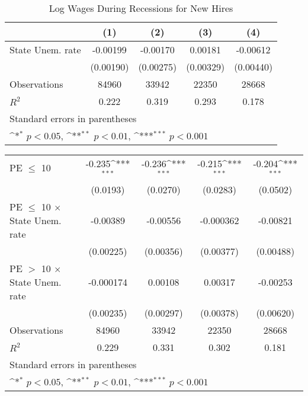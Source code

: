 \begin{table}[htbp]\centering
\def\sym#1{\ifmmode^{#1}\else\(^{#1}\)\fi}
\caption{Log Wages During Recessions for New Hires}
\begin{tabular}{l*{4}{c}}
\toprule
                                   &\multicolumn{1}{c}{(1)}         &\multicolumn{1}{c}{(2)}         &\multicolumn{1}{c}{(3)}         &\multicolumn{1}{c}{(4)}         \\
\midrule
State Unem. rate                   &    -0.00199         &    -0.00170         &     0.00181         &    -0.00612         \\
                                   &   (0.00190)         &   (0.00275)         &   (0.00329)         &   (0.00440)         \\
\midrule
Observations                       &       84960         &       33942         &       22350         &       28668         \\
\(R^{2}\)                          &       0.222         &       0.319         &       0.293         &       0.178         \\
\bottomrule
\multicolumn{5}{l}{\footnotesize Standard errors in parentheses}\\
\multicolumn{5}{l}{\footnotesize \sym{*} \(p<0.05\), \sym{**} \(p<0.01\), \sym{***} \(p<0.001\)}\\
\end{tabular}
\end{table}
{
\def\sym#1{\ifmmode^{#1}\else\(^{#1}\)\fi}
\begin{tabular}{l*{4}{c}}
\hline\hline
\hline
PE $\leq$ 10                       &      -0.235\sym{***}&      -0.236\sym{***}&      -0.215\sym{***}&      -0.204\sym{***}\\
                                   &    (0.0193)         &    (0.0270)         &    (0.0283)         &    (0.0502)         \\
[1em]
PE $\leq$ 10 $\times$ State Unem. rate&    -0.00389         &    -0.00556         &   -0.000362         &    -0.00821         \\
                                   &   (0.00225)         &   (0.00356)         &   (0.00377)         &   (0.00488)         \\
[1em]
PE $>$ 10 $\times$ State Unem. rate&   -0.000174         &     0.00108         &     0.00317         &    -0.00253         \\
                                   &   (0.00235)         &   (0.00297)         &   (0.00378)         &   (0.00620)         \\
\hline
Observations                       &       84960         &       33942         &       22350         &       28668         \\
\(R^{2}\)                          &       0.229         &       0.331         &       0.302         &       0.181         \\
\hline\hline
\multicolumn{5}{l}{\footnotesize Standard errors in parentheses}\\
\multicolumn{5}{l}{\footnotesize \sym{*} \(p<0.05\), \sym{**} \(p<0.01\), \sym{***} \(p<0.001\)}\\
\end{tabular}
}
